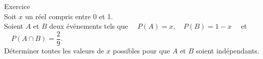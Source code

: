 \documentclass[a4paper,11pt,eval]{nsi}
\newcounter{exoNum}
\newcommand{\exo}[1]
{
	\addtocounter{exoNum}{1}
	{\titlefont\color{UGLiBlue}\Large Exercice\ \theexoNum\ \normalsize{#1}}\smallskip	
}
\begin{document}
\exo{}\\
Soit $x$ un réel compris entre 0 et 1.\\
Soient $A$ et $B$ deux événements tels que $\quad P(A)=x, \quad P(B)=1-x\quad$ et $\quad P(A \cap B)=\dfrac{2}{9}$.\\[.5em]
Déterminer toutes les valeurs de $x$ possibles pour que $A$ et $B$ soient indépendants.\\[1em]
\end{document}
